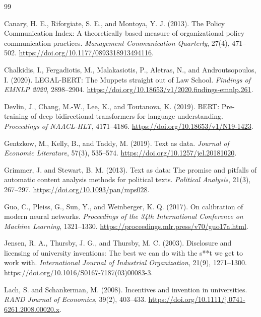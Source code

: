\documentclass[12pt]{article}
\begin{document}
\begin{thebibliography}{99}

Canary, H. E., Riforgiate, S. E., and Montoya, Y. J. (2013).
The Policy Communication Index: A theoretically based measure of organizational policy communication practices.
\textit{Management Communication Quarterly}, 27(4), 471--502.
\url{https://doi.org/10.1177/0893318913494116}.

Chalkidis, I., Fergadiotis, M., Malakasiotis, P., Aletras, N., and Androutsopoulos, I. (2020).
LEGAL-BERT: The Muppets straight out of Law School.
\textit{Findings of EMNLP 2020}, 2898--2904.
\url{https://doi.org/10.18653/v1/2020.findings-emnlp.261}.

Devlin, J., Chang, M.-W., Lee, K., and Toutanova, K. (2019).
BERT: Pre-training of deep bidirectional transformers for language understanding.
\textit{Proceedings of NAACL-HLT}, 4171--4186.
\url{https://doi.org/10.18653/v1/N19-1423}.

Gentzkow, M., Kelly, B., and Taddy, M. (2019).
Text as data.
\textit{Journal of Economic Literature}, 57(3), 535--574.
\url{https://doi.org/10.1257/jel.20181020}.

Grimmer, J. and Stewart, B. M. (2013).
Text as data: The promise and pitfalls of automatic content analysis methods for political texts.
\textit{Political Analysis}, 21(3), 267--297.
\url{https://doi.org/10.1093/pan/mps028}.

Guo, C., Pleiss, G., Sun, Y., and Weinberger, K. Q. (2017).
On calibration of modern neural networks.
\textit{Proceedings of the 34th International Conference on Machine Learning}, 1321--1330.
\url{https://proceedings.mlr.press/v70/guo17a.html}.

Jensen, R. A., Thursby, J. G., and Thursby, M. C. (2003).
Disclosure and licensing of university inventions: The best we can do with the s**t we get to work with.
\textit{International Journal of Industrial Organization}, 21(9), 1271--1300.
\url{https://doi.org/10.1016/S0167-7187(03)00083-3}.

Lach, S. and Schankerman, M. (2008).
Incentives and invention in universities.
\textit{RAND Journal of Economics}, 39(2), 403--433.
\url{https://doi.org/10.1111/j.0741-6261.2008.00020.x}.


\end{thebibliography}
\end{document}

